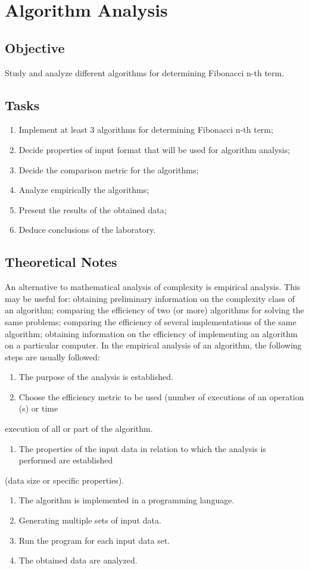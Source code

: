 \documentclass[a4paper, 12pt]{article}
\begin{document}


\section{Algorithm Analysis}
\label{sec:orgc0ff396}
\subsection{Objective}
\label{sec:orgbd7f39e}
Study and analyze different algorithms for determining Fibonacci n-th term.
\subsection{Tasks}
\label{sec:orgdc320c1}
\begin{enumerate}
\item Implement at least 3 algorithms for determining Fibonacci n-th term;
\item Decide properties of input format that will be used for algorithm analysis;
\item Decide the comparison metric for the algorithms;
\item Analyze empirically the algorithms;
\item Present the results of the obtained data;
\item Deduce conclusions of the laboratory.
\end{enumerate}
\subsection{Theoretical Notes}
\label{sec:org15e013d}
An alternative to mathematical analysis of complexity is empirical analysis.
This may be useful for: obtaining preliminary information on the complexity class of an
algorithm; comparing the efficiency of two (or more) algorithms for solving the same problems;
comparing the efficiency of several implementations of the same algorithm; obtaining information on the
efficiency of implementing an algorithm on a particular computer.
In the empirical analysis of an algorithm, the following steps are usually followed:
\begin{enumerate}
\item The purpose of the analysis is established.
\item Choose the efficiency metric to be used (number of executions of an operation (s) or time
\end{enumerate}
execution of all or part of the algorithm.
\begin{enumerate}
\item The properties of the input data in relation to which the analysis is performed are established
\end{enumerate}
(data size or specific properties).
\begin{enumerate}
\item The algorithm is implemented in a programming language.
\item Generating multiple sets of input data.
\item Run the program for each input data set.
\item The obtained data are analyzed.
\end{enumerate}
\end{document}
